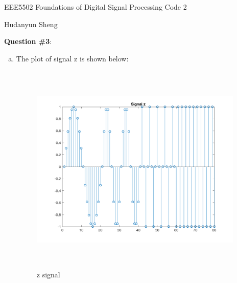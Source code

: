 \documentclass[a4paper]{article}
\begin{document}
\begin{spacing}{2.0}
\begin{flushleft}\begin{huge}EEE5502 Foundations of Digital Signal Processing   Code 2\end{huge}\end{flushleft}
\begin{flushright}\begin{Large} Hudanyun Sheng \end{Large}\end{flushright}

\Large\textbf{ Question \#3}:  \\
\normalsize
\begin{enumerate}[(a)]
\item The plot of signal z is shown below:
\begin{figure} [H]
\centering
\includegraphics[width=4in,height=4in]{signalz.png}
\caption{z signal}
\label{fig:graph}
\end{figure}


\end{enumerate}
\end{spacing}
\end{document}
